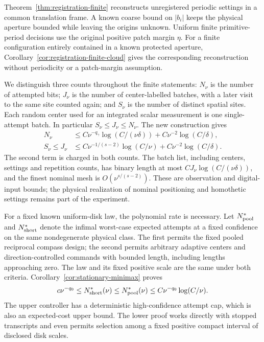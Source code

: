 Theorem~\ref{thm:registration-finite} reconstructs unregistered periodic
settings in a common translation frame. A known coarse bound on
$|b_i|$ keeps the physical aperture bounded while leaving the origins
unknown. Uniform finite primitive-period decisions use the original
positive patch margin $\eta$. For a finite configuration entirely
contained in a known protected aperture,
Corollary~\ref{cor:registration-finite-cloud} gives the corresponding
reconstruction without periodicity or a patch-margin assumption.

We distinguish three counts throughout the finite statements:
$N_\nu$ is the number of attempted bits; $J_\nu$ is the number of
center-labelled batches, with a later visit to the same site counted
again; and $S_\nu$ is the number of distinct spatial sites.
Each random center used for an integrated scalar measurement is one
single-attempt batch. In particular $S_\nu\le J_\nu\le N_\nu$.
The new construction gives
\begin{align}
 N_\nu&\le C\nu^{-q_\gamma}\log(C/(\nu\delta))
                          +C\nu^{-2}\log(C/\delta),
                                      \label{eq:intro-new-attempts}\\
 S_\nu\le J_\nu&\le C\nu^{-1/(s-2)}\log(C/\nu)
                          +C\nu^{-2}\log(C/\delta).
                                      \label{eq:intro-new-batches}
\end{align}
The second term is charged in both counts. The batch list, including
centers, settings and repetition counts, has binary length at most
$C J_\nu\log(C/(\nu\delta))$, and the finest nominal mesh is
$O(\nu^{s/(s-2)})$. These are observation and digital-input bounds;
the physical realization of nominal positioning and homothetic
settings remains part of the experiment.

For a fixed known uniform-disk law, the polynomial rate is necessary.
Let $N^*_{\rm pool}$ and $N^*_{\rm short}$ denote the infimal worst-case
expected attempts at a fixed confidence on the same nondegenerate
physical class. The first permits the fixed pooled reciprocal compass
design; the second permits arbitrary adaptive centers and
direction-controlled commands with bounded length, including lengths
approaching zero. The law and its fixed positive scale are the same
under both criteria. Corollary~\ref{cor:stationary-minimax} proves
\begin{equation}\label{eq:intro-sharp-bracket}
 c\nu^{-q_0}\le N^*_{\rm short}(\nu)
       \le N^*_{\rm pool}(\nu)
       \le C\nu^{-q_0}\log(C/\nu).
\end{equation}
The upper controller has a deterministic high-confidence attempt cap,
which is also an expected-cost upper bound. The lower proof works
directly with stopped transcripts and even permits selection among a
fixed positive compact interval of disclosed disk scales.

